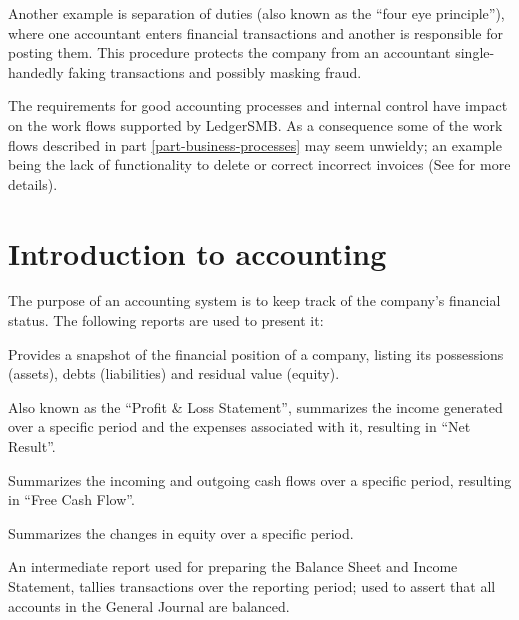 Another example is separation of duties (also known as the ``four eye principle''),
where one accountant enters financial transactions and another is responsible for
posting them. This procedure protects the company from an accountant single-handedly
faking transactions and possibly masking fraud.

The requirements for good accounting processes and internal control have impact
on the work flows supported by LedgerSMB. As a consequence some of the work flows
described in part \ref{part-business-processes} may seem unwieldy; an example being the
lack of functionality to delete or correct incorrect invoices (See  for more details).



\chapter{Introduction to accounting}
\label{cha-accounting-introduction}

The purpose of an accounting system is to keep track of the company's financial status.  The following reports are used to
present it:

\begin{description}[style=nextline]
	\item[Balance Sheet] Provides a snapshot of the financial position of a company, listing its possessions (assets), debts (liabilities) and residual value (equity).
	\item[Income Statement] Also known as the ``Profit \& Loss Statement'', summarizes the income generated over a specific period and the expenses associated with it, resulting in ``Net Result''.
	\item[Cashflow Statement\footnote{\label{cha-accounting-footnote-not-implemented}Not currently implemented in LedgerSMB}] Summarizes the incoming and outgoing cash flows over a specific period, resulting in ``Free Cash Flow''.
	\item[Statement of Owner's Equity\footref{cha-accounting-footnote-not-implemented}] Summarizes the changes in equity over a specific period.
	\item[Trial Balance] An intermediate report used for preparing the Balance Sheet and Income Statement, tallies transactions over the reporting period; used to assert that all accounts in the General Journal are balanced.
\end{description}

